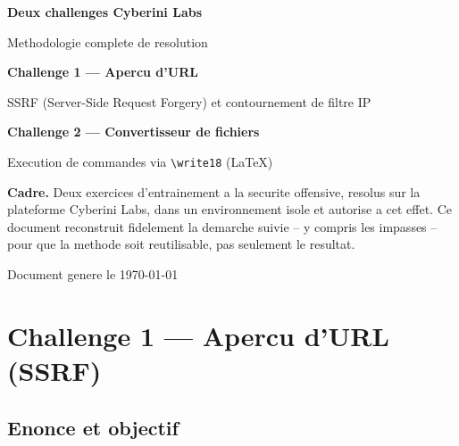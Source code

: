 \documentclass[11pt,a4paper]{article}
\begin{document}
\begin{titlepage}
\centering
\vspace*{2.2cm}
{\Huge\bfseries\color{navy} Deux challenges Cyberini Labs\par}
\vspace{0.4cm}
{\Large\color{gold} Methodologie complete de resolution\par}
\vspace{1.6cm}

{\large\bfseries\color{navy} Challenge 1 --- Apercu d'URL\par}
{\large SSRF (Server-Side Request Forgery) et contournement de filtre IP\par}
\vspace{0.8cm}
{\large\bfseries\color{navy} Challenge 2 --- Convertisseur de fichiers\par}
{\large Execution de commandes via \texttt{\textbackslash write18} (LaTeX)\par}

\vspace{2.4cm}
\begin{tcolorbox}[colback=boxok, colframe=boxokb, width=0.82\textwidth, arc=3pt, boxrule=1pt]
\textbf{Cadre.} Deux exercices d'entrainement a la securite offensive,
resolus sur la plateforme Cyberini Labs, dans un environnement isole et
autorise a cet effet. Ce document reconstruit fidelement la demarche
suivie -- y compris les impasses -- pour que la methode soit
reutilisable, pas seulement le resultat.
\end{tcolorbox}

\vfill
{\small\color{codegray} Document genere le \today\par}
\end{titlepage}

\tableofcontents
\newpage

\section{Challenge 1 --- Apercu d'URL (SSRF)}

\subsection{Enonce et objectif}
\end{document}
